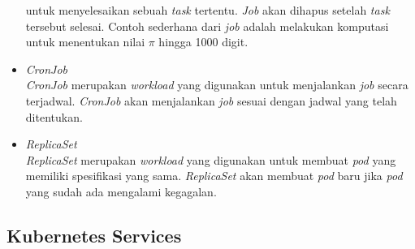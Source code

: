 \begin{itemize}
          untuk menyelesaikan sebuah \textit{task} tertentu. \textit{Job} akan dihapus setelah \textit{task} tersebut selesai.
          Contoh sederhana dari \textit{job} adalah melakukan komputasi untuk menentukan nilai $\pi$ hingga 1000 digit.
    \item \textit{CronJob} \\
          \textit{CronJob} merupakan \textit{workload} yang digunakan untuk menjalankan \textit{job} secara terjadwal.
          \textit{CronJob} akan menjalankan \textit{job} sesuai dengan jadwal yang telah ditentukan.
    \item \textit{ReplicaSet} \\
          \textit{ReplicaSet} merupakan \textit{workload} yang digunakan untuk membuat \textit{pod} yang memiliki spesifikasi yang sama.
          \textit{ReplicaSet} akan membuat \textit{pod} baru jika \textit{pod} yang sudah ada mengalami kegagalan.
\end{itemize}

\vspace{0.5cm}
\subsection{Kubernetes Services} \label{subsec:Kubernetes Services}
